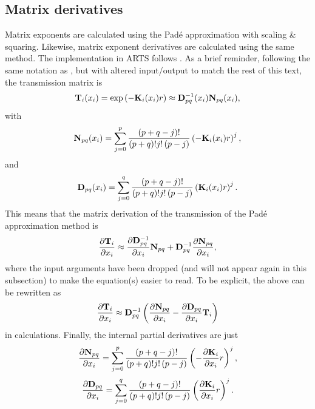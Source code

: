 \subsection{Matrix derivatives}
\label{sec:wfuns:atmvars:matder}
%
Matrix exponents are calculated using the Pad\'{e} approximation with scaling \& squaring.
Likewise, matrix exponent derivatives are calculated using the same method.
The implementation in ARTS follows \citet{brancik:06}.  As a brief reminder, following
the same notation as \citet{brancik:06}, but with
altered input/output to match the rest of this text, the transmission
matrix is
\begin{equation}
  \mathbf{T}_i(x_i) = \exp\left(-\mathbf{K}_i(x_i)r\right) \approx \mathbf{D}_{pq}^{-1}(x_i)\mathbf{N}_{pq}(x_i),\label{eq: pade}
\end{equation}
with
\begin{equation}
  \mathbf{N}_{pq}(x_i)=\sum_{j=0}^p\frac{\left(p+q-j\right)!}{\left(p+q\right)!j!\left(p-j\right)}\left(-\mathbf{K}_i(x_i)r\right)^j,
\end{equation}
and
\begin{equation}
  \mathbf{D}_{pq}(x_i)=\sum_{j=0}^q\frac{\left(p+q-j\right)!}{\left(p+q\right)!j!\left(p-j\right)}\left(\mathbf{K}_i(x_i)r\right)^j.
\end{equation}
This means that the matrix derivation of the transmission of the Pad\'{e} approximation method is
\begin{equation}
  \frac{\partial \mathbf{T}_i}{\partial x_i} \approx \frac{\partial  \mathbf{D}_{pq}^{-1}}{\partial x_i}\mathbf{N}_{pq} + \mathbf{D}_{pq}^{-1}\frac{\partial  \mathbf{N}_{pq}}{\partial x_i},
\end{equation}
where the input arguments have been dropped (and will not appear again in this subsection) to make the equation(s) easier to read.
To be explicit, the above can be rewritten as
\begin{equation}
  \frac{\partial \mathbf{T}_i}{\partial x_i} \approx \mathbf{D}_{pq}^{-1}\left(\frac{\partial  \mathbf{N}_{pq}}{\partial x_i} - \frac{\partial \mathbf{D}_{pq}}{\partial x_i} \mathbf{T}_i\right) \label{eq: pade derivative}
\end{equation}
in calculations.
Finally, the internal partial derivatives are just
\begin{equation}
  \frac{\partial \mathbf{N}_{pq}}{\partial x_i}=\sum_{j=0}^p\frac{\left(p+q-j\right)!}{\left(p+q\right)!j!\left(p-j\right)}\left(-\frac{\partial \mathbf{K}_i}{\partial x_i}r\right)^j,\label{eq: pade dn/dx}
\end{equation}
\begin{equation}
  \frac{\partial \mathbf{D}_{pq}}{\partial x_i}=\sum_{j=0}^q\frac{\left(p+q-j\right)!}{\left(p+q\right)!j!\left(p-j\right)}\left(\frac{\partial \mathbf{K}_i}{\partial x_i}r\right)^j.\label{eq: pade dd/dx}
\end{equation}


